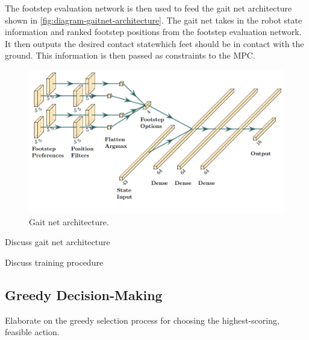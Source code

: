 The footstep evaluation network is then used to feed the gait net
architecture shown in \autoref{fig:diagram-gaitnet-architecture}. The
gait net takes in the robot state information and ranked footstep
positions from the footstep evaluation network. It then outputs the
desired contact state\textemdash which feet should be in contact with
the ground. This information is then passed as constraints to the MPC.

\begin{figure}
  \centering
  \includegraphics[width=0.5\linewidth]{images/diagrams/gaitnet-architecture.png}
  \caption{Gait net architecture.}
  \label{fig:diagram-gaitnet-architecture}
\end{figure}

\begin{todo}
  Discuss gait net architecture
\end{todo}

\begin{todo}
  Discuss training procedure
\end{todo}

\subsection{Greedy Decision-Making}

\begin{outline}
  Elaborate on the greedy selection process for choosing the
  highest-scoring, feasible action.
\end{outline}
